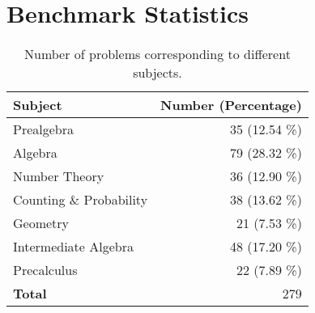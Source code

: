 \section{Benchmark Statistics}
\label{appendix:benchmark}

\begin{table}[ht]
\centering
\small
\caption{Number of problems corresponding to different subjects.}
\begin{tabular}{l|r}
\toprule
\textbf{Subject} & \textbf{Number (Percentage)} \\ \midrule
Prealgebra & 35 (12.54 \%) \\%
Algebra & 79 (28.32 \%) \\ %
Number Theory & 36 (12.90 \%) \\%
Counting \& Probability & 38 (13.62 \%) \\%
Geometry & 21 (7.53 \%) \\%
Intermediate Algebra & 48 (17.20 \%) \\%
Precalculus & 22 (7.89 \%) \\\midrule
\textbf{Total} & 279 \\\bottomrule
\end{tabular}
\label{tab:stat}
\end{table}
